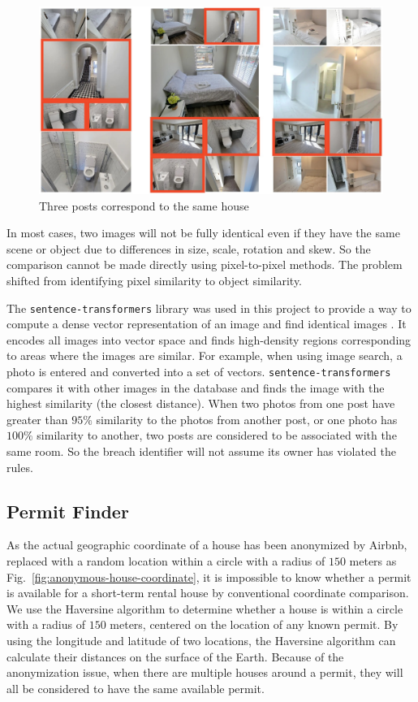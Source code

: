 \documentclass[conference, compsoc]{IEEEtran}
\begin{document}
\begin{figure}[htbp]
    \centerline{\includegraphics[width=\linewidth]{figures/same-house-photos.jpg}}
    \caption{Three posts correspond to the same house}
    \label{fig:same-house-photos}
\end{figure}

In most cases, two images will not be fully identical even if they have the same scene or object due to differences in size, scale, rotation and skew.
So the comparison cannot be made directly using pixel-to-pixel methods.
The problem shifted from identifying pixel similarity to object similarity.

The \verb|sentence-transformers| library was used in this project to provide a way to compute a dense vector representation of an image and find identical images \cite{sentence-bert}.
It encodes all images into vector space and finds high-density regions corresponding to areas where the images are similar.
For example, when using image search, a photo is entered and converted into a set of vectors.
\verb|sentence-transformers| compares it with other images in the database and finds the image with the highest similarity (the closest distance).
When two photos from one post have greater than $95\%$ similarity to the photos from another post, or one photo has $100\%$ similarity to another, two posts are considered to be associated with the same room.
So the breach identifier will not assume its owner has violated the rules.

\subsection{Permit Finder}
As the actual geographic coordinate of a house has been anonymized by Airbnb, replaced with a random location within a circle with a radius of $150$ meters as Fig.~\ref{fig:anonymous-house-coordinate},
it is impossible to know whether a permit is available for a short-term rental house by conventional coordinate comparison.
We use the Haversine algorithm \cite{haversine-algorithm} to determine whether a house is within a circle with a radius of $150$ meters, centered on the location of any known permit.
By using the longitude and latitude of two locations, the Haversine algorithm can calculate their distances on the surface of the Earth.
Because of the anonymization issue, when there are multiple houses around a permit, they will all be considered to have the same available permit.
\end{document}
